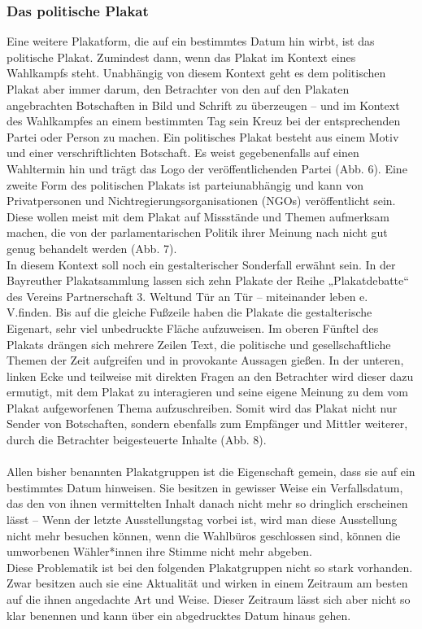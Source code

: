 \documentclass[a4paper,12pt,ngerman]{article}
\begin{document}
\subsubsection{Das politische Plakat}
Eine weitere Plakatform, die auf ein bestimmtes Datum hin wirbt, ist das politische Plakat. Zumindest dann, wenn das Plakat im Kontext eines Wahlkampfs steht. Unabhängig von diesem Kontext geht es dem politischen Plakat aber immer darum, den Betrachter von den auf den Plakaten angebrachten Botschaften in Bild und Schrift zu überzeugen -- und im Kontext des Wahlkampfes an einem bestimmten Tag sein Kreuz bei der entsprechenden Partei oder Person zu machen. Ein politisches Plakat besteht aus einem Motiv und einer verschriftlichten Botschaft. Es weist gegebenenfalls auf einen Wahltermin hin und trägt das Logo der veröffentlichenden Partei (Abb. 6). Eine zweite Form des politischen Plakats ist parteiunabhängig und kann von Privatpersonen und Nichtregierungsorganisationen (NGOs) veröffentlicht sein. Diese wollen meist mit dem Plakat auf Missstände und Themen aufmerksam machen, die von der parlamentarischen Politik ihrer Meinung nach nicht gut genug behandelt werden (Abb. 7). \\
In diesem Kontext soll noch ein gestalterischer Sonderfall erwähnt sein. In der Bayreuther Plakatsammlung lassen sich zehn Plakate der Reihe „Plakatdebatte“ des Vereins \glqq Partnerschaft 3. Welt\grqq und \glqq Tür an Tür -- miteinander leben e. V.\grqq finden. Bis auf die gleiche Fußzeile haben die Plakate die gestalterische Eigenart, sehr viel unbedruckte Fläche aufzuweisen. Im oberen Fünftel des Plakats drängen sich mehrere Zeilen Text, die politische und gesellschaftliche Themen der Zeit aufgreifen und in provokante Aussagen gießen. In der unteren, linken Ecke und teilweise mit direkten Fragen an den Betrachter wird dieser dazu ermutigt, mit dem Plakat zu interagieren und seine eigene Meinung zu dem vom Plakat aufgeworfenen Thema aufzuschreiben. Somit wird das Plakat nicht nur Sender von Botschaften, sondern ebenfalls zum Empfänger und Mittler weiterer, durch die Betrachter beigesteuerte Inhalte (Abb. 8). \\
\\
Allen bisher benannten Plakatgruppen ist die Eigenschaft gemein, dass sie auf ein bestimmtes Datum hinweisen. Sie besitzen in gewisser Weise ein Verfallsdatum, das den von ihnen vermittelten Inhalt danach nicht mehr so dringlich erscheinen lässt -- Wenn der letzte Ausstellungstag vorbei ist, wird man diese Ausstellung nicht mehr besuchen können, wenn die Wahlbüros geschlossen sind, können die umworbenen Wähler*innen ihre Stimme nicht mehr abgeben.\\
Diese Problematik ist bei den folgenden Plakatgruppen nicht so stark vorhanden. Zwar besitzen auch sie eine Aktualität und wirken in einem Zeitraum am besten auf die ihnen angedachte Art und Weise. Dieser Zeitraum lässt sich aber nicht so klar benennen und kann über ein abgedrucktes Datum hinaus gehen. \\
\end{document}
